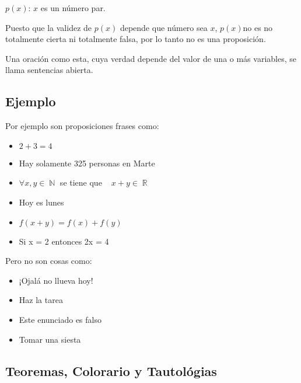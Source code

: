 \documentclass[12pt]{report}                                    %
\DeclareMathOperator \Space {\quad}                             %
\DeclareMathOperator \MiniSpace {\;}                            %
\DeclareMathOperator \Naturals {\mathbb{N}}                     %
\DeclareMathOperator \Reals {\mathbb{R}}                        %
\begin{document}
            $p(x)$: $x$ es un número par.

            Puesto que la validez de $p(x)$ depende que número sea $x$, $p(x)$no es no totalmente cierta ni
            totalmente falsa, por lo tanto no es una proposición.

            Una oración como esta, cuya verdad depende del valor de una o más variables,
            se llama sentencias abierta.



            \clearpage
            \subsection*{Ejemplo}


                Por ejemplo son proposiciones frases como:
                \begin{itemize}
                    \item $2 + 3 = 4$
                    \item Hay solamente 325 personas en Marte
                    \item $\forall x, y \in \Naturals$ se tiene que $\MiniSpace x+y \in \Reals$
                    \item Hoy es lunes
                    \item $f(x+y) = f(x) + f(y)$
                    \item Si x = 2 entonces 2x = 4
                \end{itemize}

                Pero no son cosas como:
                \begin{itemize}
                    \item ¡Ojalá no llueva hoy!
                    \item Haz la tarea
                    \item Este enunciado es falso
                    \item Tomar una siesta
                \end{itemize}



        \clearpage
        \subsection{Teoremas, Colorario y Tautológias}
            
\end{document}
